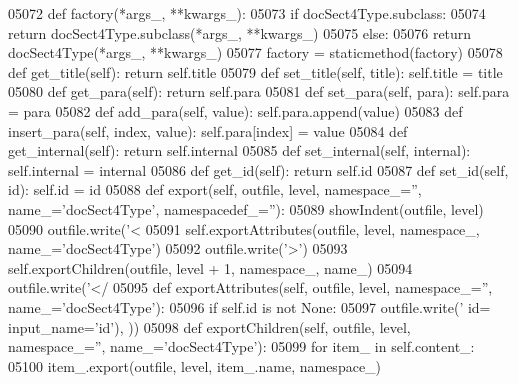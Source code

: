 \begin{DoxyCode}
{{{{{{{{{{{{{{{{{{{{{{{{{{{{{{{{{{{{{{{{{{{{{{{{{{{{{{{{{{{{{{{{{{{{{{{{{{{{{{{{{{{{{{{{{{{{{{{{{{{{{{{{{{{{{{{{{{{{{{{{{{{{{{{{{{{{{{{{{{{{{{{{{{{{{{{{{{{{{{{{{{{{{{{{{{{{{{{{{{{{{{{{{{{{{{{{{{{{{{{{{{{{{{{{{{{{{{{{{{{{{{{{{{{{{{{{{{{{{{{{{{{{{{{{{{{{{{{{{{{{{{{{{{{{{{{{{{{{{{{{{{{{{{{{{{{{{{{{{{{{{{{{{{{{{{{{{{{{{{{{{{{{{{{{{{{{05072     \textcolor{keyword}{def }factory(*args\_, **kwargs\_):
05073         \textcolor{keywordflow}{if} docSect4Type.subclass:
05074             \textcolor{keywordflow}{return} docSect4Type.subclass(*args\_, **kwargs\_)
05075         \textcolor{keywordflow}{else}:
05076             \textcolor{keywordflow}{return} docSect4Type(*args\_, **kwargs\_)
05077     factory = staticmethod(factory)
05078     \textcolor{keyword}{def }get_title(self): \textcolor{keywordflow}{return} self.title
05079     \textcolor{keyword}{def }set_title(self, title): self.title = title
05080     \textcolor{keyword}{def }get_para(self): \textcolor{keywordflow}{return} self.para
05081     \textcolor{keyword}{def }set_para(self, para): self.para = para
05082     \textcolor{keyword}{def }add_para(self, value): self.para.append(value)
05083     \textcolor{keyword}{def }insert_para(self, index, value): self.para[index] = value
05084     \textcolor{keyword}{def }get_internal(self): \textcolor{keywordflow}{return} self.internal
05085     \textcolor{keyword}{def }set_internal(self, internal): self.internal = internal
05086     \textcolor{keyword}{def }get_id(self): \textcolor{keywordflow}{return} self.id
05087     \textcolor{keyword}{def }set_id(self, id): self.id = id
05088     \textcolor{keyword}{def }export(self, outfile, level, namespace\_='', name\_='docSect4Type', namespacedef\_=''):
05089         showIndent(outfile, level)
05090         outfile.write(\textcolor{stringliteral}{'<%
05091         self.exportAttributes(outfile, level, namespace\_, name\_=\textcolor{stringliteral}{'docSect4Type'})
05092         outfile.write(\textcolor{stringliteral}{'>'})
05093         self.exportChildren(outfile, level + 1, namespace\_, name\_)
05094         outfile.write(\textcolor{stringliteral}{'</%
05095     \textcolor{keyword}{def }exportAttributes(self, outfile, level, namespace\_='', name\_='docSect4Type'):
05096         \textcolor{keywordflow}{if} self.id \textcolor{keywordflow}{is} \textcolor{keywordflow}{not} \textcolor{keywordtype}{None}:
05097             outfile.write(\textcolor{stringliteral}{' id=%
      input\_name=\textcolor{stringliteral}{'id'}), ))
05098     \textcolor{keyword}{def }exportChildren(self, outfile, level, namespace\_='', name\_='docSect4Type'):
05099         \textcolor{keywordflow}{for} item\_ \textcolor{keywordflow}{in} self.content_:
05100             item\_.export(outfile, level, item\_.name, namespace\_)
}}}}}}}}}}}}}}}}}}}}}}}}}}}}}}}}}}}}}}}}}}}}}}}}}}}}}}}}}}}}}}}}}}}}}}}}}}}}}}}}}}}}}}}}}}}}}}}}}}}}}}}}}}}}}}}}}}}}}}}}}}}}}}}}}}}}}}}}}}}}}}}}}}}}}}}}}}}}}}}}}}}}}}}}}}}}}}}}}}}}}}}}}}}}}}}}}}}}}}}}}}}}}}}}}}}}}}}}}}}}}}}}}}}}}}}}}}}}}}}}}}}}}}}}}}}}}}}}}}}}}}}}}}}}}}}}}}}}}}}}}}}}}}}}}}}}}}}}}}}}}}}}}}}}}}}}}}}}}}}}}}}}}}}}}}}}}}}
\end{DoxyCode}
